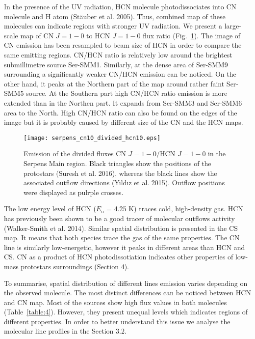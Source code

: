 \documentclass{aa}
\begin{document}
In the presence of the UV radiation, HCN molecule photodissociates into CN molecule and H atom (Stäuber et al. 2005). Thus, combined map of these molecules can indicate regions with stronger UV radiation. We present a large-scale map of CN $J=1-0$ to HCN $J=1-0$ flux ratio (Fig.~\ref{cn10_div_hcn10}). The image of CN emission has been resampled to beam size of HCN in order to compare the same emitting regions. CN/HCN ratio is relatively low around the brightest submillimetre source Ser-SMM1. Similarly, at the dense area of Ser-SMM9 surrounding a significantly weaker CN/HCN emission can be noticed. On the other hand, it peaks at the Northern part of the map around rather faint Ser-SMM5 source. At the Southern part high CN/HCN ratio emission is more extended than in the Northen part. It expands from Ser-SMM3 and Ser-SMM6 area to the North. High CN/HCN ratio can also be found on the edges of the image but it is probably caused by different size of the CN and the HCN maps.

\begin{figure}
   \centering
   \texttt{[image: serpens\_cn10\_divided\_hcn10.eps]}
      \caption{Emission of the divided fluxes CN $J=1-0$/HCN $J=1-0$ in the Serpens Main region. Black triangles show the positions of the protostars (Suresh et al. 2016), whereas the black lines show the associated outflow directions (Y{\i}ld{\i}z et al. 2015). Outflow positions were displayed as pulrple crosses.}
         \label{cn10_div_hcn10}
   \end{figure}

The low energy level of HCN ($E_\mathrm{u}$ = 4.25 K) traces cold, high-density gas. HCN has previously been shown to be a good tracer of molecular outflows activity (Walker-Smith et al. 2014). Similar spatial distribution is presented in the CS map. It means that both species trace the gas of the same properties. The CN line is similarly low-energetic, however it peaks in different areas than HCN and CS. CN as a product of HCN photodissotiation indicates other properties of low-mass protostars surroundings (Section 4).

To summarise, spatial distribution of different lines emission varies depending on the observed molecule. The most distinct differences can be noticed between HCN and CN map. Most of the sources show high flux values in both molecules (Table~\ref{table:4}). However, they present unequal levels which indicates regions of different properties. In order to better understand this issue we analyse the molecular line profiles in the Section 3.2. 
\end{document}
